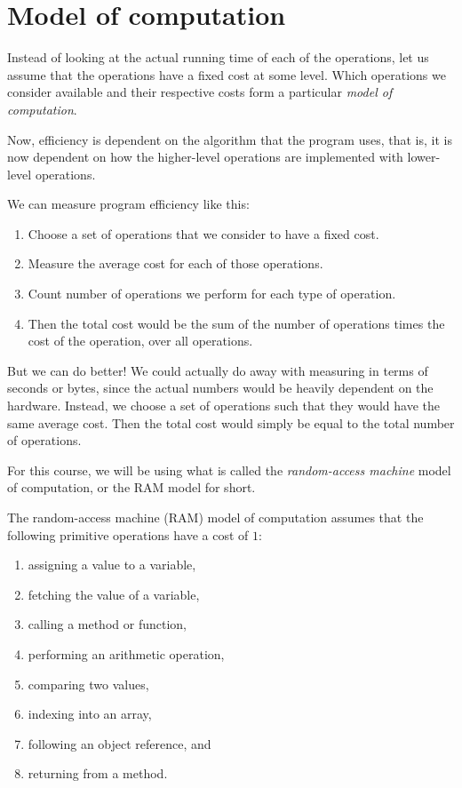 \section{Model of computation}
Instead of looking at the actual running time of each of the operations, let us assume that the operations have a fixed cost at some level. Which operations we consider available and their respective costs form a particular \textit{model of computation}. 

Now, efficiency is dependent on the algorithm that the program uses, that is, it is now dependent on how the higher-level operations are implemented with lower-level operations.

We can measure program efficiency like this:
\begin{enumerate}
    \item Choose a set of operations that we consider to have a fixed cost.
    \item Measure the average cost for each of those operations.
    \item Count number of operations we perform for each type of operation.
    \item Then the total cost would be the sum of the number of operations times the cost of the operation, over all operations.
\end{enumerate}

But we can do better! We could actually do away with measuring in terms of seconds or bytes, since the actual numbers would be heavily dependent on the hardware. Instead, we choose a set of operations such that they would have the same average cost. Then the total cost would simply be equal to the total number of operations.

For this course, we will be using what is called the \textit{random-access machine} model of computation, or the RAM model for short.
\begin{definition}
The random-access machine (RAM) model of computation assumes that the following primitive operations have a cost of $1$:
\begin{enumerate}
    \item assigning a value to a variable,
    \item fetching the value of a variable,
    \item calling a method or function,
    \item performing an arithmetic operation,
    \item comparing two values,
    \item indexing into an array,
    \item following an object reference, and
    \item returning from a method.
\end{enumerate}
\end{definition}

